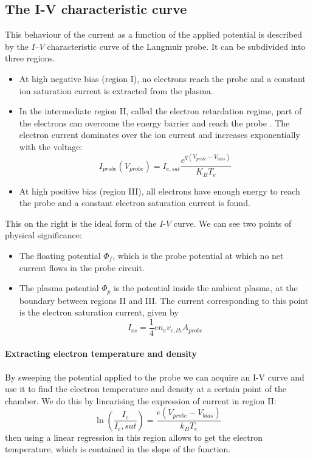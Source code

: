 \subsection{The I-V characteristic curve}
This behaviour of the current as a function of the applied potential is described by the $I$--$V$ characteristic curve of the Langmuir probe.
It can be subdivided into three regions. 
\begin{itemize}
    \item At high negative bias (region I), no electrons reach the probe and a constant ion saturation current is extracted from the plasma. 
    \item In the intermediate region II, called the electron retardation regime, part of the electrons can overcome the energy barrier and reach the probe \cite{piel_plasma_2017}. The electron current dominates over the ion current and increases exponentially with the voltage:
    \begin{equation}
        I_{probe}(V_{probe}) = I_{e,sat} \frac{e^{q(V_{probe} - V_{bias})}}{K_B T_e}
    \end{equation}
    \item At high positive bias (region III), all electrons have enough energy to reach the probe and a constant electron saturation current is found. 
\end{itemize}
This on the right is the ideal form of the $I$-$V$ curve.
We can see two points of physical significance:
\begin{itemize}
    \item The floating potential $\Phi_f$, which is the probe potential at which no net current flows in the probe circuit.
    \item The plasma potential $\Phi_p$ is the potential inside the ambient plasma, at the boundary between regions II and III. The current corresponding to this point is the electron saturation current, given by
    \begin{equation}
        I_{es} = \frac{1}{4}e n_e v_{e,th} A_{probe}
    \end{equation}
\end{itemize}

\paragraph{Extracting electron temperature and density}
By sweeping the potential applied to the probe we can acquire an I-V curve and use it to find the electron temperature and density at a certain point of the chamber.
We do this by linearising the expression of current in region II:
\begin{equation}
    \ln\left(\frac{I_e}{I_e,sat} \right) = \frac{e(V_{probe} - V_{bias})}{k_B T_e}
\end{equation} 
then using a linear regression in this region allows to get the electron temperature, which is contained in the slope of the function.

